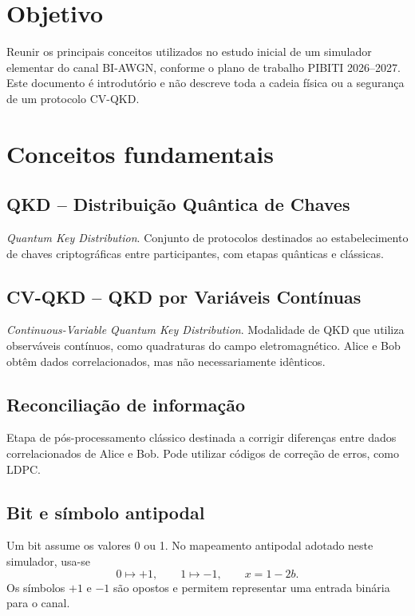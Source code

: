 \documentclass[12pt,openright,oneside,a4paper,english,brazil]{abntex2}
\begin{document}
\frenchspacing
\imprimircapa
\textual

\chapter{Objetivo}
Reunir os principais conceitos utilizados no estudo inicial de um simulador elementar do canal BI-AWGN, conforme o plano de trabalho PIBITI 2026--2027. Este documento é introdutório e não descreve toda a cadeia física ou a segurança de um protocolo CV-QKD.

\chapter{Conceitos fundamentais}
\section{QKD -- Distribuição Quântica de Chaves}
\textit{Quantum Key Distribution}. Conjunto de protocolos destinados ao estabelecimento de chaves criptográficas entre participantes, com etapas quânticas e clássicas.

\section{CV-QKD -- QKD por Variáveis Contínuas}
\textit{Continuous-Variable Quantum Key Distribution}. Modalidade de QKD que utiliza observáveis contínuos, como quadraturas do campo eletromagnético. Alice e Bob obtêm dados correlacionados, mas não necessariamente idênticos.

\section{Reconciliação de informação}
Etapa de pós-processamento clássico destinada a corrigir diferenças entre dados correlacionados de Alice e Bob. Pode utilizar códigos de correção de erros, como LDPC.

\section{Bit e símbolo antipodal}
Um bit assume os valores 0 ou 1. No mapeamento antipodal adotado neste simulador, usa-se
\begin{equation}
0\mapsto +1,\qquad 1\mapsto -1,\qquad x=1-2b.
\end{equation}
Os símbolos $+1$ e $-1$ são opostos e permitem representar uma entrada binária para o canal.
\end{document}
